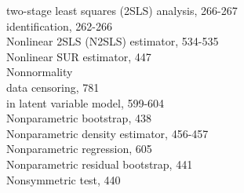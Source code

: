 \documentclass[10pt]{article}
\begin{document}
two-stage least squares (2SLS) analysis, 266-267\\
identification, 262-266\\
Nonlinear 2SLS (N2SLS) estimator, 534-535\\
Nonlinear SUR estimator, 447\\
Nonnormality\\
data censoring, 781\\
in latent variable model, 599-604\\
Nonparametric bootstrap, 438\\
Nonparametric density estimator, 456-457\\
Nonparametric regression, 605\\
Nonparametric residual bootstrap, 441\\
Nonsymmetric test, 440
\end{document}
